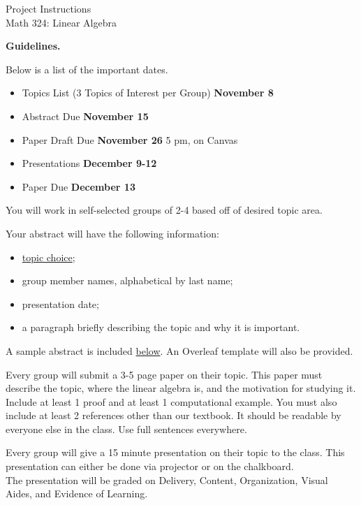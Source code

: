\documentclass{article}
\begin{document}
\large
\begin{center}
		Project Instructions\\
		Math 324: Linear Algebra
\end{center}
\noindent
\textbf{Guidelines.}
\begin{description}[font=\normalfont\itshape-\space]
	\item[Dates] Below is a list of the important dates.
		\begin{itemize}
			\item Topics List (3 Topics of Interest per Group) \textbf{November 8} 
			\item Abstract Due \textbf{November 15} 
			\item Paper Draft Due \textbf{November 26} 5 pm, on Canvas
			\item Presentations \textbf{December 9-12}
			\item Paper Due \textbf{December 13}
		\end{itemize}
	\item[Groups] You will work in self-selected groups of 2-4 based off of desired topic area.
	\item[Abstract] Your abstract will have the following information: 
		\begin{itemize}
			\item \hyperlink{topics}{topic choice};
			\item group member names, alphabetical by last name;
			\item presentation date;
			\item a paragraph briefly describing the topic and why it is important.
		\end{itemize}
		A sample abstract is included \hyperlink{sampleabstract}{below}.  An Overleaf template will also be provided.
	\item[Paper] Every group will submit a 3-5 page paper on their topic.  This paper must describe the topic, where the linear algebra is, and the motivation for studying it. Include at least 1 proof and at least 1 computational example. You must also include at least 2 references other than our textbook. It should be readable by everyone else in the class. Use full sentences everywhere.  
	\item[Presentation] Every group will give a 15 minute presentation on their topic to the class.  This presentation can either be done via projector or on the chalkboard.\\
	The presentation will be graded on Delivery, Content, Organization, Visual Aides, and Evidence of Learning.\\

\end{description}
\end{document}
